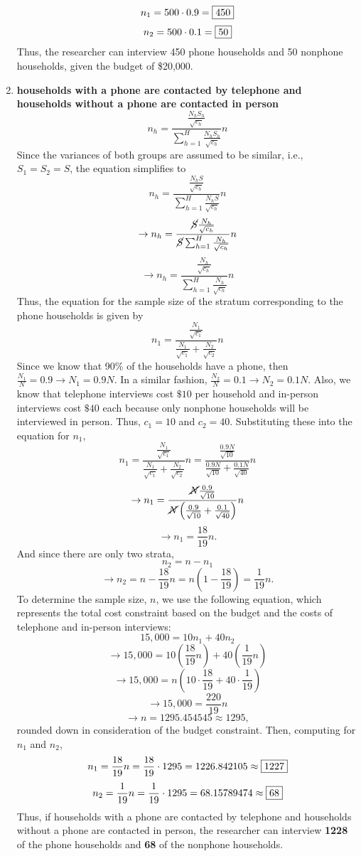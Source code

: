 \documentclass[]{article}
\begin{document}
\begin{enumerate}[label=(\alph*)]
\[
n_1 = 500 \cdot 0.9 = \fbox{450}
\]
\[
n_2 = 500 \cdot 0.1 = \fbox{50}
\]
Thus, the researcher can interview 450 phone households and 50 nonphone households, given the budget of \$20,000.
\item \textbf{households with a phone are contacted by telephone and households without a phone are contacted in person}
\[
n_h = \frac{\frac{N_hS_h}{\sqrt{c_h}}}{\sum_{h=1}^{H}{\frac{N_hS_h}{\sqrt{c_h}}}}n
\]
Since the variances of both groups are assumed to be similar, i.e., $S_1 = S_2 = S$, the equation simplifies to
\[
n_h = \frac{\frac{N_hS}{\sqrt{c_h}}}{\sum_{h=1}^{H}{\frac{N_hS}{\sqrt{c_h}}}}n
\]
\[
\rightarrow n_h = \frac{\cancel S\frac{N_h}{\sqrt{c_h}}}{\cancel S\sum_{h=1}^{H}{\frac{N_h}{\sqrt{c_h}}}}n
\]
\[
\rightarrow n_h = \frac{\frac{N_h}{\sqrt{c_h}}}{\sum_{h=1}^{H}{\frac{N_h}{\sqrt{c_h}}}}n
\]
Thus, the equation for the sample size of the stratum corresponding to the phone households is given by
\[
n_1 = \frac{\frac{N_1}{\sqrt{c_1}}}{\frac{N_1}{\sqrt{c_1}}+\frac{N_2}{\sqrt{c_2}}}n
\]
Since we know that 90\% of the households have a phone, then $\frac{N_1}{N}=0.9 \rightarrow N_1 = 0.9N$. In a similar fashion, $\frac{N_2}{N}=0.1 \rightarrow N_2 = 0.1N$. Also, we know that telephone interviews cost $\$10$ per household and in-person interviews cost $\$40$ each because only nonphone households will be interviewed in person. Thus, $c_1 = 10$ and $c_2 = 40$. Substituting these into the equation for $n_1$,
\[
n_1 = \frac{\frac{N_1}{\sqrt{c_1}}}{\frac{N_1}{\sqrt{c_1}}+\frac{N_2}{\sqrt{c_2}}}n = \frac{\frac{0.9N}{\sqrt{10}}}{\frac{0.9N}{\sqrt{10}}+\frac{0.1N}{\sqrt{40}}}n
\]
\[
\rightarrow n_1 = \frac{\cancel N\frac{0.9}{\sqrt{10}}}{\cancel N\left(\frac{0.9}{\sqrt{10}}+\frac{0.1}{\sqrt{40}}\right)}n
\]
\[
\rightarrow n_1 = \frac{18}{19}n.
\]
And since there are only two strata,
\[
n_2 = n - n_1
\]
\[
\rightarrow n_2 = n - \frac{18}{19}n = n\left(1-\frac{18}{19}\right) = \frac{1}{19}n.
\]
To determine the sample size, $n$, we use the following equation, which represents the total cost constraint based on the budget and the costs of telephone and in-person interviews:
\[
15,000 = 10n_1 +40n_2
\]
\[
\rightarrow 15,000 = 10\left(\frac{18}{19}n\right) + 40\left(\frac{1}{19}n\right)
\]
\[
\rightarrow 15,000 = n\left(10\cdot\frac{18}{19} + 40\cdot\frac{1}{19}\right)
\]
\[
\rightarrow 15,000 = \frac{220}{19}n
\]
\[
\rightarrow n = 1295.454545 \approx 1295,
\]
rounded down in consideration of the budget constraint. Then, computing for $n_1$ and $n_2$, 
\[
n_1 = \frac{18}{19}n = \frac{18}{19}\cdot1295 = 1226.842105 \approx \fbox{1227}
\]
\[
n_2 = \frac{1}{19}n = \frac{1}{19}\cdot1295 = 68.15789474 \approx \fbox{68}
\]
Thus, if households with a phone are contacted by telephone and households without a phone are contacted in person, the researcher can interview \textbf{1228} of the phone households and \textbf{68} of the nonphone households. 
\end{enumerate}
\end{document}

